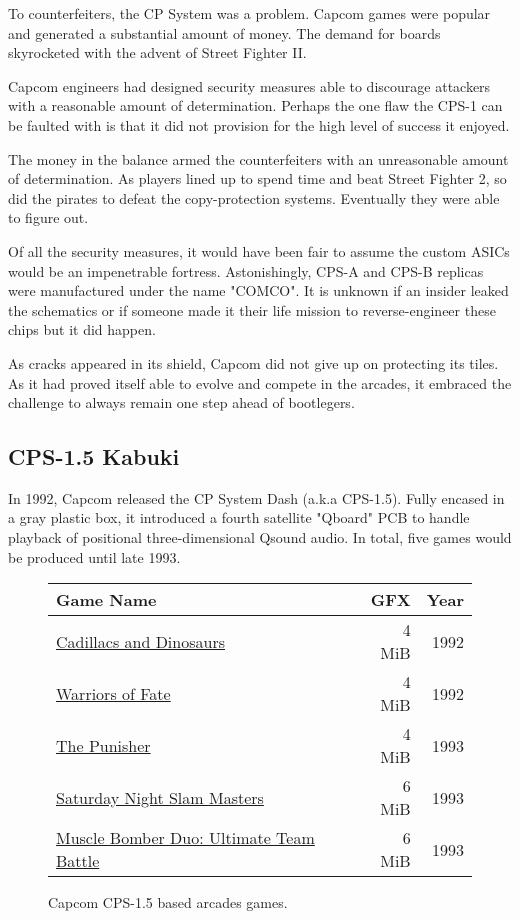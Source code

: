 To counterfeiters, the CP System was a problem. Capcom games were popular and generated a substantial amount of money. The demand for boards skyrocketed with the advent of Street Fighter II. 

Capcom engineers had designed security measures able to discourage attackers with a reasonable amount of determination. Perhaps the one flaw the CPS-1 can be faulted with is that it did not provision for the high level of success it enjoyed.

The money in the balance armed the counterfeiters with an unreasonable amount of determination. As players lined up to spend time and beat Street Fighter 2, so did the pirates to defeat the copy-protection systems. Eventually they were able to figure out. 


Of all the security measures, it would have been fair to assume the custom ASICs would be an impenetrable fortress. Astonishingly, CPS-A and CPS-B replicas were manufactured under the name "COMCO"\cite{arcadeHackerCPS1}. It is unknown if an insider leaked the schematics or if someone made it their life mission to reverse-engineer these chips but it did happen.

As cracks appeared in its shield, Capcom did not give up on protecting its tiles. As it had proved itself able to evolve and compete in the arcades, it embraced the challenge to always remain one step ahead of bootlegers.

\subsection{CPS-1.5 Kabuki}
In 1992, Capcom released the CP System Dash (a.k.a CPS-1.5). Fully encased in a gray plastic box, it introduced a fourth satellite "Qboard" PCB to handle playback of positional three-dimensional Qsound audio. In total, five games would be produced until late 1993.

\begin{figure}[H]
{ \setlength{\tabcolsep}{3.0pt}
\begin{tabularx}{\textwidth}{Xrr}
  \toprule    
  \textbf{Game Name} & \textbf{ GFX }  & \textbf{ Year } \\               
  \toprule    
\href{}{Cadillacs and Dinosaurs} & 4 MiB & 1992 \\ 
\href{}{Warriors of Fate} & 4 MiB & 1992 \\ 
\href{}{The Punisher} & 4 MiB & 1993 \\ 
\href{}{Saturday Night Slam Masters} & 6 MiB & 1993 \\ 
\href{}{Muscle Bomber Duo: Ultimate Team Battle} & 6 MiB & 1993 \\ 
  \toprule    
\end{tabularx}%
}\caption*{Capcom CPS-1.5 based arcades games.}
\end{figure}

